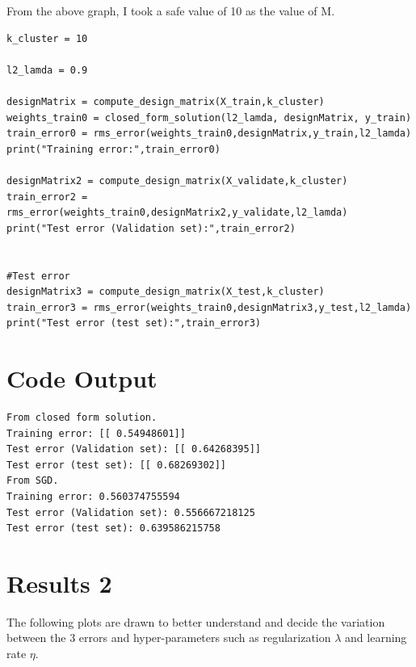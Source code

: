 \documentclass[a4paper,11pt]{article}
\begin{document}
From the above graph, I took a safe value of 10 as the value of $\mathrm{M}$.

\begin{lstlisting}
k_cluster = 10

l2_lamda = 0.9

designMatrix = compute_design_matrix(X_train,k_cluster)
weights_train0 = closed_form_solution(l2_lamda, designMatrix, y_train)
train_error0 = rms_error(weights_train0,designMatrix,y_train,l2_lamda)
print("Training error:",train_error0)

designMatrix2 = compute_design_matrix(X_validate,k_cluster)
train_error2 = rms_error(weights_train0,designMatrix2,y_validate,l2_lamda)
print("Test error (Validation set):",train_error2)


#Test error
designMatrix3 = compute_design_matrix(X_test,k_cluster)
train_error3 = rms_error(weights_train0,designMatrix3,y_test,l2_lamda)
print("Test error (test set):",train_error3)
\end{lstlisting}


\section*{Code Output}

\begin{lstlisting}[label={list:fifth},caption=Code output.]
From closed form solution.
Training error: [[ 0.54948601]]
Test error (Validation set): [[ 0.64268395]]
Test error (test set): [[ 0.68269302]]
From SGD.
Training error: 0.560374755594
Test error (Validation set): 0.556667218125
Test error (test set): 0.639586215758
\end{lstlisting}

\vfill
\section*{Results 2}

The following plots are drawn to better understand and decide the variation between the 3 errors and hyper-parameters such as regularization $\lambda$ and learning rate $\eta$.
\end{document}
